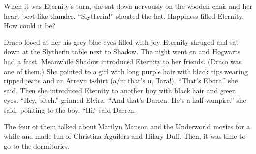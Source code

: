 \begin{sloppypar}
    When it was Eternity's turn, she sat down nervously on the wooden chair and her heart beat like thunder. \enquote{Slytherin!} shouted the hat. Happiness filled Eternity. How could it be?
\end{sloppypar}

Draco looed at her his grey blue eyes filled with joy. Eternity shruged and sat down at the Slytherin table next to Shadow. The night went on and Hogwarts had a feast. Meanwhile Shadow introduced Eternity to her friends. (Draco was one of them.) She pointed to a girl with long purple hair with black tips wearing ripped jeans and an Atreyu t-shirt (a/n: that's u, Tara!). \enquote{That's Elvira.} she said. Then she introduced Eternity to another boy with black hair and green eyes. \enquote{Hey, bitch.} grinned Elvira. \enquote{And that's Darren. He's a half-vampire.} she said, pointing to the boy. \enquote{Hi.} said Darren.

The four of them talked about Marilyn Manson and the Underworld movies for a while and made fun of Christina Aguilera and Hilary Duff. Then, it was time to go to the dormitories.